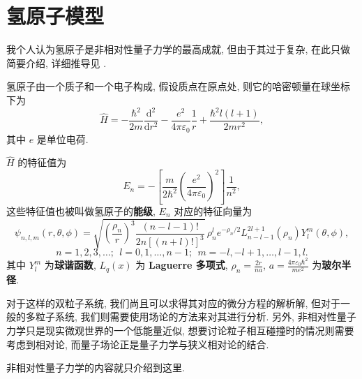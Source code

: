 \section{氢原子模型}
我个人认为氢原子是非相对性量子力学的最高成就, 但由于其过于复杂, 在此只做简要介绍, 详细推导见 \cite{hall2013quantum,griffiths_schroeter_2018}.

氢原子由一个质子和一个电子构成, 假设质点在原点处, 则它的哈密顿量在球坐标下为
\[ \hat{H}=-\frac{\hbar^2}{2m}\frac{\mathrm{d}^2}{\mathrm{d}r^2}-\frac{e^2}{4\pi\varepsilon_0}\frac{1}{r}+\frac{\hbar^2l(l+1)}{2mr^2}, \]
其中 $ e $ 是单位电荷.

$ \hat{H} $ 的特征值为
\[ E_n=-\left[\frac{m}{2\hbar^2}\left(\frac{e^2}{4\pi\varepsilon_0}\right)^2\right]\frac{1}{n^2}, \]
这些特征值也被叫做氢原子的{\bf 能级}, $ E_n $ 对应的特征向量为 
\[ \psi_{n,l,m}(r,\theta,\phi)=\sqrt{\left(\frac{\rho_n}{r}\right)^3\frac{(n-l-1)!}{2n[(n+l)!]^3}}\,\rho_n^le^{-\rho_n/2}L^{2l+1}_{n-l-1}(\rho_n)Y^m_l(\theta,\phi), \]
\[ n=1,2,3,\dots;\ \ l=0,1,\dots,n-1;\ \ m=-l,-l+1,\dots,l-1,l. \]
其中 $Y^m_l$ 为{\bf 球谐函数}, $ L_q(x) $ 为 {\bf Laguerre 多项式}, $ \rho_n=\frac{2r}{na} $, $ a=\frac{4\pi\varepsilon_0\hbar^2}{me^2} $ 为{\bf 玻尔半径}.

对于这样的双粒子系统, 我们尚且可以求得其对应的微分方程的解析解, 但对于一般的多粒子系统, 我们则需要使用场论的方法来对其进行分析. 另外, 非相对性量子力学只是现实微观世界的一个低能量近似, 想要讨论粒子相互碰撞时的情况则需要考虑到相对论, 而量子场论正是量子力学与狭义相对论的结合.

非相对性量子力学的内容就只介绍到这里.